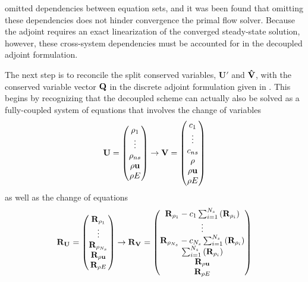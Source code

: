  omitted dependencies between equation sets,
and it was been found\cite{candler} that omitting these dependencies does not
hinder convergence the primal flow solver.  Because the adjoint requires an
exact linearization of the converged steady-state solution, however, these
cross-system dependencies must be accounted for in the decoupled adjoint
formulation.

The next step is to reconcile the split conserved variables, $\mathbf{U}'$ and
$\mathbf{\hat{V}}$, with the conserved variable vector $\mathbf Q$ in the discrete adjoint
formulation given in . This begins by recognizing that the
decoupled scheme can actually also be solved as a fully-coupled system of
equations that involves the change of variables
\begin{equation}
  \mathbf U = \begin{pmatrix}
    \rho_1 \\
    \vdots \\
    \rho_{ns} \\
    \rho \mathbf u \\
    \rho E
  \end{pmatrix}
  \rightarrow
  \mathbf V = \begin{pmatrix}
    c_1 \\
    \vdots \\
    c_{ns} \\
    \rho \\
    \rho \mathbf u \\
    \rho E
  \end{pmatrix}
  \label{u-v-vars}
\end{equation}
as well as the change of equations
\begin{equation}
  \mathbf R_{{\mathbf U}_{}} =
  \begin{pmatrix}
    \mathbf R_{\rho_1} \\
    \vdots \\
    \mathbf R_{\rho_{N_s}} \\
    \mathbf R_{\rho \mathbf u} \\
    \mathbf R_{\rho E}
  \end{pmatrix}
  \rightarrow
  \mathbf R_{{\mathbf V}_{}} =
  \begin{pmatrix}
    \mathbf R_{\rho_1} - c_1 \sum_{i=1}^{N_s}\left(\mathbf R_{\rho_i}\right) \\
    \vdots \\
    \mathbf R_{\rho_{N_s}} - c_{N_s} \sum_{i=1}^{N_s}\left(\mathbf R_{\rho_i}\right) \\
    \sum_{i=1}^{N_s}\left(\mathbf R_{\rho_i}\right) \\
    \mathbf R_{\rho \mathbf u} \\
    \mathbf R_{\rho E}
  \end{pmatrix}
  \label{fc-to-dc-res}
\end{equation}
